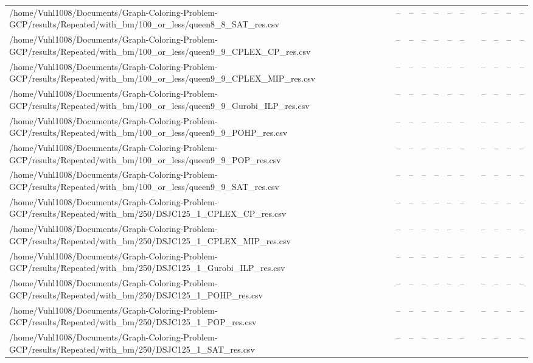\begin{table}[htbp]
\begin{tabular}{llllllllllll}
/home/Vuhl1008/Documents/Graph-Coloring-Problem-GCP/results/Repeated/with\_bm/100\_or\_less/queen8\_8\_SAT\_res.csv & -- & -- & -- & -- & -- & -- & {} & -- & -- & -- & -- \\
/home/Vuhl1008/Documents/Graph-Coloring-Problem-GCP/results/Repeated/with\_bm/100\_or\_less/queen9\_9\_CPLEX\_CP\_res.csv & -- & -- & -- & -- & -- & -- & {} & -- & -- & -- & -- \\
/home/Vuhl1008/Documents/Graph-Coloring-Problem-GCP/results/Repeated/with\_bm/100\_or\_less/queen9\_9\_CPLEX\_MIP\_res.csv & -- & -- & -- & -- & -- & -- & {} & -- & -- & -- & -- \\
/home/Vuhl1008/Documents/Graph-Coloring-Problem-GCP/results/Repeated/with\_bm/100\_or\_less/queen9\_9\_Gurobi\_ILP\_res.csv & -- & -- & -- & -- & -- & -- & {} & -- & -- & -- & -- \\
/home/Vuhl1008/Documents/Graph-Coloring-Problem-GCP/results/Repeated/with\_bm/100\_or\_less/queen9\_9\_POHP\_res.csv & -- & -- & -- & -- & -- & -- & {} & -- & -- & -- & -- \\
/home/Vuhl1008/Documents/Graph-Coloring-Problem-GCP/results/Repeated/with\_bm/100\_or\_less/queen9\_9\_POP\_res.csv & -- & -- & -- & -- & -- & -- & {} & -- & -- & -- & -- \\
/home/Vuhl1008/Documents/Graph-Coloring-Problem-GCP/results/Repeated/with\_bm/100\_or\_less/queen9\_9\_SAT\_res.csv & -- & -- & -- & -- & -- & -- & {} & -- & -- & -- & -- \\
/home/Vuhl1008/Documents/Graph-Coloring-Problem-GCP/results/Repeated/with\_bm/250/DSJC125\_1\_CPLEX\_CP\_res.csv & -- & -- & -- & -- & -- & -- & {} & -- & -- & -- & -- \\
/home/Vuhl1008/Documents/Graph-Coloring-Problem-GCP/results/Repeated/with\_bm/250/DSJC125\_1\_CPLEX\_MIP\_res.csv & -- & -- & -- & -- & -- & -- & {} & -- & -- & -- & -- \\
/home/Vuhl1008/Documents/Graph-Coloring-Problem-GCP/results/Repeated/with\_bm/250/DSJC125\_1\_Gurobi\_ILP\_res.csv & -- & -- & -- & -- & -- & -- & {} & -- & -- & -- & -- \\
/home/Vuhl1008/Documents/Graph-Coloring-Problem-GCP/results/Repeated/with\_bm/250/DSJC125\_1\_POHP\_res.csv & -- & -- & -- & -- & -- & -- & {} & -- & -- & -- & -- \\
/home/Vuhl1008/Documents/Graph-Coloring-Problem-GCP/results/Repeated/with\_bm/250/DSJC125\_1\_POP\_res.csv & -- & -- & -- & -- & -- & -- & {} & -- & -- & -- & -- \\
/home/Vuhl1008/Documents/Graph-Coloring-Problem-GCP/results/Repeated/with\_bm/250/DSJC125\_1\_SAT\_res.csv & -- & -- & -- & -- & -- & -- & {} & -- & -- & -- & -- \\

\end{tabular}
\end{table}
